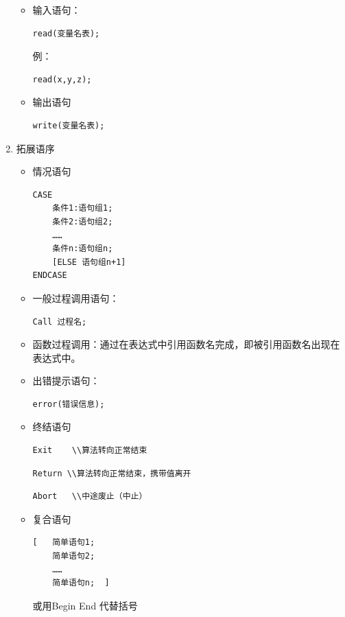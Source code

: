 \documentclass[AutoFakeBold]{LZUThesis2007}
\begin{document}
\begin{enumerate}
\begin{itemize}
\begin{itemize}
							\end{itemize}
						\item 输入语句：
\begin{lstlisting}
read(变量名表);
\end{lstlisting}
例：
\begin{lstlisting}
read(x,y,z);
\end{lstlisting}
						\item 输出语句
\begin{lstlisting}
write(变量名表);
\end{lstlisting}
					\end{itemize}
				\item 拓展语序
\begin{itemize}
	\item 情况语句
\begin{lstlisting}
CASE
	条件1:语句组1;
	条件2:语句组2;
	……
	条件n:语句组n;
	[ELSE 语句组n+1]
ENDCASE
\end{lstlisting}
	\item 一般过程调用语句：
\begin{lstlisting}
Call 过程名;
\end{lstlisting}
	\item 函数过程调用：通过在表达式中引用函数名完成，即被引用函数名出现在表达式中。
	\item 出错提示语句：
\begin{lstlisting}
error(错误信息);
\end{lstlisting}
	\item 终结语句
\begin{lstlisting}
Exit 	\\算法转向正常结束
\end{lstlisting}
\begin{lstlisting}
Return \\算法转向正常结束，携带值离开
\end{lstlisting}
\begin{lstlisting}
Abort 	\\中途废止（中止）
\end{lstlisting}
	\item 复合语句
\begin{lstlisting}
[ 	简单语句1;
	简单语句2;
	……
	简单语句n;	]
\end{lstlisting}
或用Begin End 代替括号


\end{itemize}
\end{enumerate}
\end{document}
